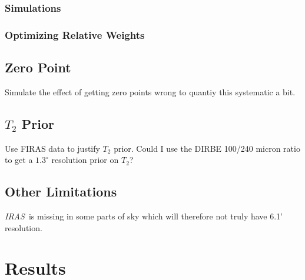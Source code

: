 \documentclass{emulateapj}
\newcommand{\IRAS}{{\it IRAS}}
\begin{document}
\subsubsection{Simulations}

\subsubsection{Optimizing Relative Weights}



\subsection{Zero Point}
Simulate the effect of getting zero points wrong to quantiy this
systematic a bit.

\subsection{$T_{2}$ Prior}
Use FIRAS data to justify $T_2$ prior. Could I use the DIRBE 100/240 micron
ratio to get a $1.3^{\circ}$ resolution prior on $T_2$?

\subsection{Other Limitations}
\IRAS~is missing in some parts of sky which will therefore not truly have 6.1' 
resolution.

\section{Results}
\label{sec:results}

\end{document}
